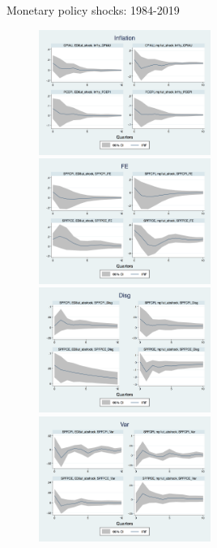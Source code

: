 \documentclass{beamer}
\begin{document}
\begin{frame}{Monetary policy shocks: 1984-2019}

\begin{figure}
	\includegraphics[width=0.5\textwidth,totalheight=\0.4\textheight]{figuresDraft/Inf_ashocks.png} 
	\smallskip
	\includegraphics[width=0.5\textwidth,totalheight=\0.4\textheight]{figuresDraft/SPFFE_ashocks.png} \\
	\smallskip
	\includegraphics[width=0.5\textwidth,totalheight=\0.4\textheight]{figuresDraft/SPFDisg_ab_ashocks.png} 
	\smallskip
	\includegraphics[width=0.5\textwidth,totalheight=\0.4\textheight]{figuresDraft/SPFVar_ab_ashocks.png}  
\end{figure}

\end{frame}
\end{document}
